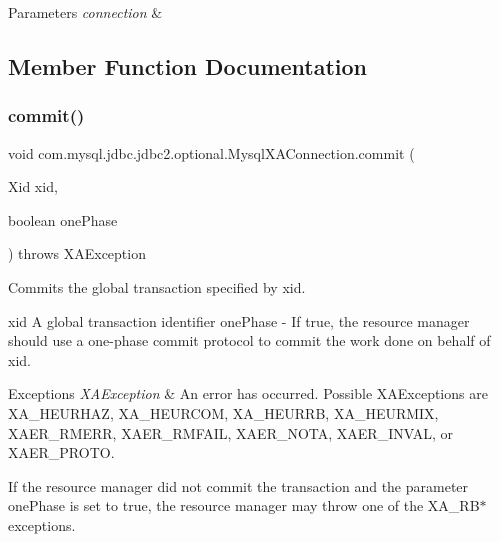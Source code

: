 \begin{DoxyParams}{Parameters}
{\em connection} & \\
\hline
\end{DoxyParams}


\subsection{Member Function Documentation}
\mbox{\label{classcom_1_1mysql_1_1jdbc_1_1jdbc2_1_1optional_1_1_mysql_x_a_connection_a0e248ebae4b509b14237febcd79c7132}} 
\subsubsection{\texorpdfstring{commit()}{commit()}}
{\footnotesize\ttfamily void com.\+mysql.\+jdbc.\+jdbc2.\+optional.\+Mysql\+X\+A\+Connection.\+commit (\begin{DoxyParamCaption}\item[{Xid}]{xid,  }\item[{boolean}]{one\+Phase }\end{DoxyParamCaption}) throws X\+A\+Exception}

Commits the global transaction specified by xid.

xid A global transaction identifier  one\+Phase -\/ If true, the resource manager should use a one-\/phase commit protocol to commit the work done on behalf of xid.


\begin{DoxyExceptions}{Exceptions}
{\em X\+A\+Exception} & An error has occurred. Possible X\+A\+Exceptions are X\+A\+\_\+\+H\+E\+U\+R\+H\+AZ, X\+A\+\_\+\+H\+E\+U\+R\+C\+OM, X\+A\+\_\+\+H\+E\+U\+R\+RB, X\+A\+\_\+\+H\+E\+U\+R\+M\+IX, X\+A\+E\+R\+\_\+\+R\+M\+E\+RR, X\+A\+E\+R\+\_\+\+R\+M\+F\+A\+IL, X\+A\+E\+R\+\_\+\+N\+O\+TA, X\+A\+E\+R\+\_\+\+I\+N\+V\+AL, or X\+A\+E\+R\+\_\+\+P\+R\+O\+TO.\\
\hline
\end{DoxyExceptions}
If the resource manager did not commit the transaction and the parameter one\+Phase is set to true, the resource manager may throw one of the X\+A\+\_\+\+R\+B$\ast$ exceptions.

